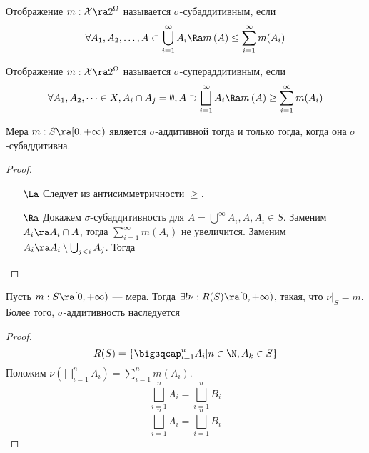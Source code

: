 \begin{definition}
    Отображение \(m: \mathcal{X} \ra 2^\Omega\) называется \(\sigma\)-субаддитивным, если 
    \[\forall A_1, A_2, \dots, A \subset \bigcup_{i = 1}^\infty A_i \Ra m\left( A  \right) \le \sum_{i = 1}^\infty m(A_i)\]
\end{definition}

\begin{definition}
    Отображение \(m: \mathcal{X} \ra 2^\Omega\) называется \(\sigma\)-супераддитивным, если 
    \[\forall A_1, A_2, \dots \in X, A_i \cap A_j = \emptyset, A \supset \bigsqcup_{i = 1}^\infty A_i  \Ra m\left( A \right) \ge \sum_{i = 1}^\infty m(A_i)\]
\end{definition}

\begin{proposition}
    Мера \(m: S \ra [0, +\infty)\) является \(\sigma\)-аддитивной тогда и только тогда, когда она \(\sigma\)-субаддитивна.
\end{proposition}
\begin{proof}\indent
    \begin{enumerate}
        \item[\(\La\)] Следует из антисимметричности \(\ge\).
        \item[\(\Ra\)] Докажем \(\sigma\)-субаддитивность для \(A = \bigcup^\infty A_i, A, A_i \in S\). Заменим \(A_i \ra A_i \cap A\), тогда \(\sum_{i = 1}^\infty m(A_i) \) не увеличится. Заменим \(A_i \ra A_i \setminus \bigcup_{j < i} A_j\). Тогда 
    \end{enumerate}
\end{proof}

\begin{proposition}
    Пусть \(m: S \ra [0, +\infty)\) --- мера. Тогда \(\exists ! \nu: R(S) \ra [0, +\infty)\), такая, что \(\nu|_S = m\). Более того, \(\sigma\)-аддитивность наследуется
\end{proposition}
\begin{proof}
    \[R(S) = \left\{ \bigsqcap^n_{i = 1} A_i | n \in \N, A_k \in S \right\}\]
    Положим \(\nu\left( \bigsqcup_{i = 1}^n A_i \right) = \sum_{i = 1}^n m(A_i)\).
    \[\bigsqcup_{i = 1}^n A_i = \bigsqcup_{i = 1}^n B_i\]
    \[\bigsqcup_{i = 1}^n A_i = \bigsqcup_{i = 1}^n B_i\]
\end{proof}
